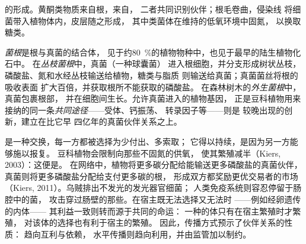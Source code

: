 \begin{omfigure}
{\small {}的形成。黄酮类物质来自根，来自，
二者共同识别伙伴；根毛卷曲，侵染线
将细菌带入植物体内，皮层随之形成，
其中类菌体在维持的低氧环境中固氮，
以换取糖类。}
\end{omfigure}

\begin{definition}[菌根]\label{def:b3:microbiomes:mycorrhiza}
\emph{菌根}是根与真菌的结合体，
见于约\qty{80}{\%}的植物物种中，也见于最早的陆生植物化石中。
在\emph{丛枝菌根}中，真菌（一种球囊菌）
进入根细胞，并分支形成树状丛枝，
磷酸盐、氮和水经丛枝输送给植物，糖类与脂质
则输送给真菌；真菌菌丝将根的吸收表面
扩大百倍，并获取根所不能获取的磷酸盐。
在森林树木的\emph{外生菌根}中，真菌包裹根部，
并在细胞间生长。允许真菌进入的植物基因，
正是豆科植物用来接纳的同一条\emph{共同途径}——受体、钙振荡、
转录因子等——则是
较晚出现的创新，建立在比它早
四亿年的真菌伙伴关系之上。
\end{definition}

\begin{proposition}[交换及其监管]\label{prop:b3:microbiomes:sanctions}
是一种交换，每一方都被选择为少付出、多索取；
它得以持续，是因为另一方能够施以报复。
豆科植物会限制向那些不固氮的供氧，
使其繁殖减半（Kiers, 2003）：这便是\emph{}。
在网络中，植物将更多碳分配给能输送更多磷酸盐的真菌伙伴，
真菌则将更多磷酸盐分配给支付更多碳的根，
形成双方都奖励更优交易者的市场
（Kiers, 2011）。乌贼排出不发光的发光器官细菌；
人类免疫系统则容忍停留于肠腔中的菌，
攻击穿过肠壁的那些。在宿主既无法选择又无法时
——例如经卵遗传的内体——
其利益一致则转而源于共同的命运：
一种的体只有在宿主繁殖时才繁殖，
对该体的选择也有利于宿主的繁殖。
因此，传播方式预示了伙伴关系的性质：
趋向互利与依赖，
水平传播则趋向利用，并由监管加以制约。
\end{proposition}
\admitted

